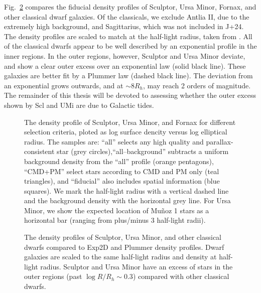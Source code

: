 Fig.~\ref{fig:classical_dwarfs_densities} compares the fiducial density
profiles of Sculptor, Ursa Minor, Fornax, and other classical dwarf
galaxies. Of the classicals, we exclude Antlia II, due to the extremely
high background, and Sagittarius, which was not included in J+24. The
density profiles are scaled to match at the half-light radius, taken
from \citet{munoz+2018}. All of the classical dwarfs appear to be well
described by an exponential profile in the inner regions. In the outer
regions, however, Sculptor and Ursa Minor deviate, and show a clear
outer excess over an exponential law (solid black line). These galaxies
are better fit by a Plummer law (dashed black line). The deviation from
an exponential grows outwards, and at \(\sim 8 R_h\), may reach 2 orders
of magnitude. The remainder of this thesis will be devoted to assessing
whether the outer excess shown by Scl and UMi are due to Galactic tides.

\begin{figure}
\centering
{}
\caption[Sculptor density profiles]{The density profile of Sculptor,
Ursa Minor, and Fornax for different selection criteria, ploted as log
surface dencity versus log elliptical radius. The samples are: ``all''
selects any high quality and parallax-consistent star (grey
circles),``all--background'' subtracts a uniform background density from
the ``all'' profile (orange pentagons), ``CMD+PM'' select stars
according to CMD and PM only (teal triangles), and ``fiducial'' also
includes spatial information (blue squares). We mark the half-light
radius with a vertical dashed line and the background density with the
horizontal grey line. For Ursa Minor, we show the expected location of
Muñoz 1 stars as a horizontal bar (ranging from plus/minus 3 half-light
radii).}\label{fig:scl_observed_profiles}
\end{figure}

\begin{figure}
\centering
{}
\caption[Classical dwarf density profiles]{The density profiles of
Sculptor, Ursa Minor, and other classical dwarfs compared to Exp2D and
Plummer density profiles. Dwarf galaxies are scaled to the same
half-light radius and density at half-light radius. Sculptor and Ursa
Minor have an excess of stars in the outer regions (past
\(\log R/R_h \sim 0.3\)) compared with other classical
dwarfs.}\label{fig:classical_dwarfs_densities}
\end{figure}
